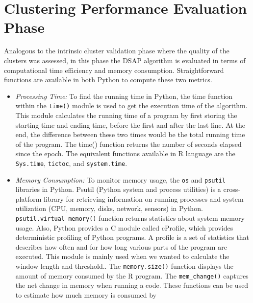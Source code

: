 \section{Clustering Performance Evaluation Phase}
Analogous to the intrinsic cluster validation phase where the quality of the clusters was assessed, in this phase the DSAP algorithm is evaluated in terms of computational time efficiency and memory consumption. Straightforward functions are available in both Python to compute these two metrics. 
\begin{itemize}
    \item \textit{Processing Time:} To find the running time in Python, the time function within the \texttt{time()} module is used to get the execution time of the algorithm. This module calculates the running time of a program by first storing the starting time and ending time, before the first and after the last line. At the end, the difference between these two times would be the total running time of the program. The time() function returns the number of seconds elapsed since the epoch. The equivalent functions available in R language are the \texttt{Sys.time}, \texttt{tictoc}, and \texttt{system.time}.

    \item \textit{Memory Consumption:} To monitor memory usage, the \texttt{os} and \texttt{psutil} libraries in Python. Psutil (Python system and process utilities) is a cross-platform library for retrieving information on running processes and system utilization (CPU, memory, disks, network, sensors) in Python. \texttt{psutil.virtual\_memory()} function returns statistics about system memory usage. Also, Python provides a C module called cProfile, which provides deterministic profiling of Python programs. A profile is a set of statistics that describes how often and for how long various parts of the program are executed. This module is mainly used when we wanted to calculate the window length and threshold.. The \texttt{memory.size()} function displays the amount of memory consumed by the R program. The \texttt{mem\_change()} captures the net change in memory when running a code. These functions can be used to estimate how much memory is consumed by  



\end{itemize}



